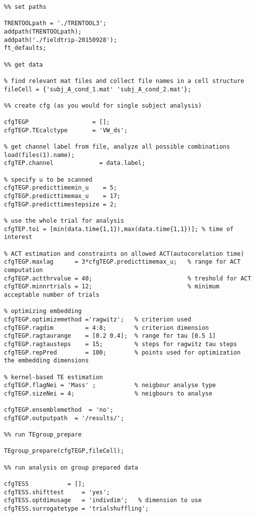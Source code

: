 \begin{lstlisting}
%% set paths

TRENTOOLpath = './TRENTOOL3';
addpath(TRENTOOLpath); 
addpath('./fieldtrip-20150928');
ft_defaults;

%% get data

% find relevant mat files and collect file names in a cell structure
fileCell = {'subj_A_cond_1.mat' 'subj_A_cond_2.mat'};

%% create cfg (as you would for single subject analysis)

cfgTEGP                  = [];
cfgTEGP.TEcalctype       = 'VW_ds'; 

% get channel label from file, analyze all possible combinations
load(files(1).name);
cfgTEP.channel             = data.label;

% specify u to be scanned
cfgTEGP.predicttimemin_u    = 5;
cfgTEGP.predicttimemax_u    = 17;
cfgTEGP.predicttimestepsize = 2;

% use the whole trial for analysis
cfgTEP.toi = [min(data.time{1,1}),max(data.time{1,1})]; % time of interest

% ACT estimation and constraints on allowed ACT(autocorelation time)
cfgTEGP.maxlag      = 3*cfgTEGP.predicttimemax_u;   % range for ACT computation
cfgTEGP.actthrvalue = 40;                           % treshold for ACT 
cfgTEGP.minnrtrials = 12;                           % minimum acceptable number of trials

% optimizing embedding
cfgTEGP.optimizemethod ='ragwitz';   % criterion used
cfgTEGP.ragdim         = 4:8;        % criterion dimension
cfgTEGP.ragtaurange    = [0.2 0.4];  % range for tau [0.5 1]
cfgTEGP.ragtausteps    = 15;         % steps for ragwitz tau steps
cfgTEGP.repPred        = 100;        % points used for optimization the embedding dimensions

% kernel-based TE estimation
cfgTEGP.flagNei = 'Mass' ;           % neigbour analyse type
cfgTEGP.sizeNei = 4;                 % neigbours to analyse

cfgTEGP.ensemblemethod  = 'no';
cfgTEGP.outputpath  = '/results/';

%% run TEgroup_prepare

TEgroup_prepare(cfgTEGP,fileCell);

%% run analysis on group prepared data

cfgTESS		      = [];
cfgTESS.shifttest     = 'yes';
cfgTESS.optdimusage   = 'indivdim';   % dimension to use
cfgTESS.surrogatetype = 'trialshuffling';


\end{lstlisting}
